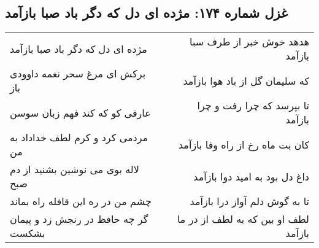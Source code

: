 \begin{center}
\section*{غزل شماره ۱۷۴: مژده ای دل که دگر باد صبا بازآمد}
\label{sec:sh174}
\begin{longtable}{l p{0.5cm} r}
مژده ای دل که دگر باد صبا بازآمد
&&
هدهد خوش خبر از طرف سبا بازآمد
\\
برکش ای مرغ سحر نغمه داوودی باز
&&
که سلیمان گل از باد هوا بازآمد
\\
عارفی کو که کند فهم زبان سوسن
&&
تا بپرسد که چرا رفت و چرا بازآمد
\\
مردمی کرد و کرم لطف خداداد به من
&&
کان بت ماه رخ از راه وفا بازآمد
\\
لاله بوی می نوشین بشنید از دم صبح
&&
داغ دل بود به امید دوا بازآمد
\\
چشم من در ره این قافله راه بماند
&&
تا به گوش دلم آواز درا بازآمد
\\
گر چه حافظ در رنجش زد و پیمان بشکست
&&
لطف او بین که به لطف از در ما بازآمد
\\
\end{longtable}
\end{center}
